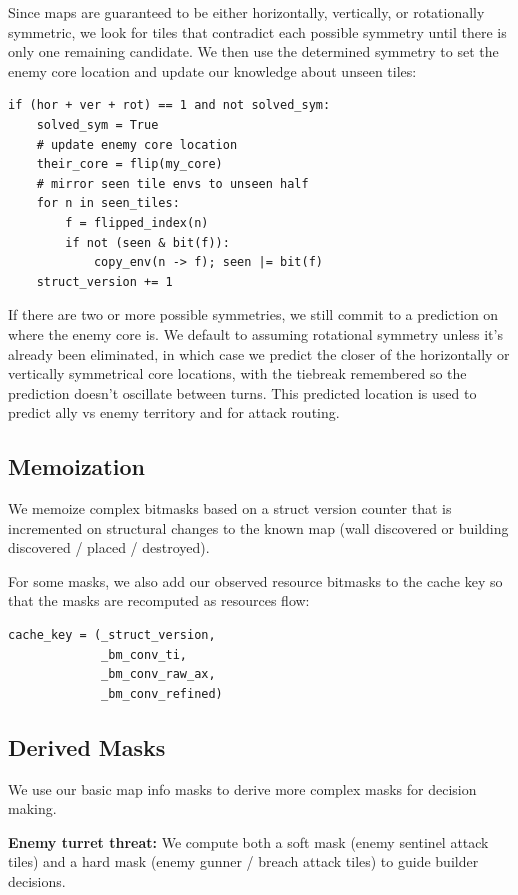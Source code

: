 \documentclass[10pt,sigconf,nonacm]{acmart}
\begin{document}
Since maps are guaranteed to be either horizontally, vertically, or rotationally symmetric, we look for tiles that contradict each possible symmetry until there is only one remaining candidate. We then use the determined symmetry to set the enemy core location and update our knowledge about unseen tiles:

\begin{lstlisting}
if (hor + ver + rot) == 1 and not solved_sym:
    solved_sym = True
    # update enemy core location
    their_core = flip(my_core)
    # mirror seen tile envs to unseen half
    for n in seen_tiles:
        f = flipped_index(n)
        if not (seen & bit(f)):
            copy_env(n -> f); seen |= bit(f)
    struct_version += 1
\end{lstlisting}

If there are two or more possible symmetries, we still commit to a prediction on where the enemy core is. We default to assuming rotational symmetry unless it's already been eliminated, in which case we predict the closer of the horizontally or vertically symmetrical core locations, with the tiebreak remembered so the prediction doesn't oscillate between turns. This predicted location is used to predict ally vs enemy territory and for attack routing.

\subsection{Memoization}

We memoize complex bitmasks based on a struct version counter that is incremented on structural changes to the known map (wall discovered or building discovered / placed / destroyed).

For some masks, we also add our observed resource bitmasks to the cache key so that the masks are recomputed as resources flow:

\begin{lstlisting}
cache_key = (_struct_version, 
             _bm_conv_ti, 
             _bm_conv_raw_ax, 
             _bm_conv_refined)
\end{lstlisting}

\subsection{Derived Masks}

We use our basic map info masks to derive more complex masks for decision making.


\textbf{Enemy turret threat:} We compute both a soft mask (enemy sentinel attack tiles) and a hard mask (enemy gunner / breach attack tiles) to guide builder decisions.
\end{document}
